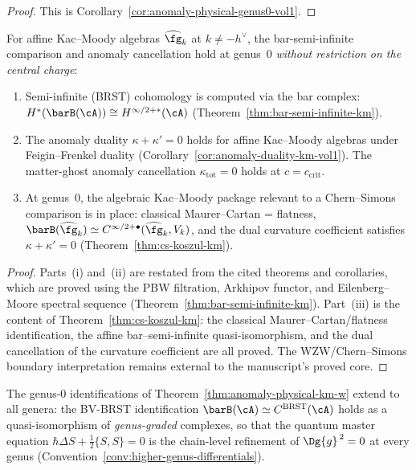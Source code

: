\begin{proof}
This is Corollary~\ref{cor:anomaly-physical-genus0-vol1}.
\end{proof}

\begin{theorem}\label{thm:anomaly-physical-km-w}
For affine Kac--Moody algebras $\widehat{\fg}_k$ at
$k \neq -h^\vee$, the bar-semi-infinite comparison and anomaly
cancellation hold at genus~$0$ \emph{without restriction on the
central charge}:
\begin{enumerate}[label=\textup{(\roman*)}]
\item Semi-infinite \textup{(}BRST\textup{)}
 cohomology is computed via the bar complex:
 $H^*(\barB(\cA)) \cong H^{\infty/2+*}(\cA)$
 \textup{(}Theorem~\textup{\ref{thm:bar-semi-infinite-km})}.
\item The anomaly duality $\kappa + \kappa' = 0$ holds for
 affine Kac--Moody algebras under Feigin--Frenkel duality
 \textup{(}Corollary~\textup{\ref{cor:anomaly-duality-km-vol1})}.
 The matter-ghost anomaly cancellation
 $\kappa_{\mathrm{tot}} = 0$ holds at
 $c = c_{\mathrm{crit}}$.
\item At genus~$0$, the algebraic Kac--Moody package relevant to
 a Chern--Simons comparison is in place:
 classical Maurer--Cartan = flatness,
 $\barB(\widehat{\fg}_k) \simeq
 C^{\infty/2+\bullet}(\widehat{\fg}_k, V_k)$, and the dual
 curvature coefficient satisfies $\kappa + \kappa' = 0$
 \textup{(}Theorem~\textup{\ref{thm:cs-koszul-km})}.
\end{enumerate}
\end{theorem}

\begin{proof}
Parts~(i) and~(ii) are restated from the cited theorems and
corollaries, which are proved using the PBW filtration,
Arkhipov functor, and Eilenberg--Moore spectral sequence
(Theorem~\ref{thm:bar-semi-infinite-km}).
Part~(iii) is the content of
Theorem~\ref{thm:cs-koszul-km}: the classical
Maurer--Cartan/flatness identification, the affine
bar--semi-infinite quasi-isomorphism, and the dual cancellation of
the curvature coefficient are all proved. The WZW/Chern--Simons
boundary interpretation remains external to the manuscript's
proved core.
\end{proof}

\begin{conjecture}\label{conj:anomaly-physical}
The genus-$0$ identifications of
Theorem~\textup{\ref{thm:anomaly-physical-km-w}} extend to all
genera: the BV-BRST identification
$\barB(\cA) \simeq C^{\mathrm{BRST}}(\cA)$ holds as a
quasi-isomorphism of \emph{genus-graded} complexes, so that the
quantum master equation
$\hbar \Delta S + \tfrac{1}{2}\{S, S\} = 0$ is the chain-level
refinement of $\Dg{g}^{\,2} = 0$ at every genus
\textup{(}Convention~\textup{\ref{conv:higher-genus-differentials})}.
\end{conjecture}

